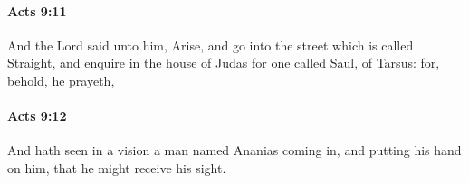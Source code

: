		\paragraph{Acts 9:11} %
			\label{ACTS-9-11}

			And the Lord said unto him, Arise, and go into the street which is called Straight, and enquire in the house of Judas for one called Saul, of Tarsus: for, behold, he prayeth,

			\begin{framed}
			\scriptsize
				\begin{compactdesc}
					\item[SBLG] 
				\end{compactdesc}
			\end{framed}

		\paragraph{Acts 9:12} %
			\label{ACTS-9-12}

			And hath seen in a vision a man named Ananias coming in, and putting his hand on him, that he might receive his sight.

